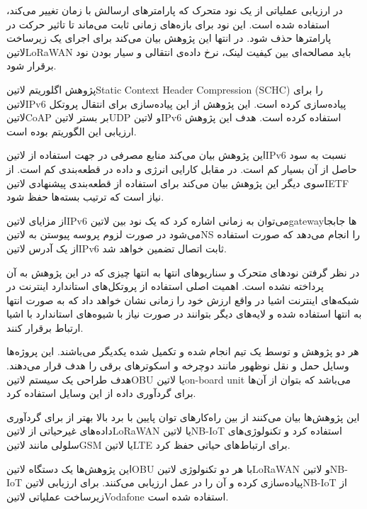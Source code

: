 در ارزیابی عملیاتی از یک نود متحرک که پارامترهای ارسالش با زمان تغییر می‌کند، استفاده شده است. این نود برای بازه‌های زمانی ثابت می‌ماند تا تاثیر حرکت در پارامترها حذف شود.
در انتها این پژوهش بیان می‌کند برای اجرای یک زیرساخت ‌لاتین{LoRaWAN} باید مصالحه‌ای بین کیفیت لینک، نرخ داده‌ی انتقالی و سیار بودن نود برقرار شود.


پژوهش 
اگلوریتم ‌لاتین{Static Context Header Compression (SCHC)} را برای ‌لاتین{IPv6} پیاده‌سازی کرده است.
این پژوهش از این پیاده‌سازی برای انتقال پروتکل ‌لاتین{CoAP} بر بستر ‌لاتین{UDP} و ‌لاتین{IPv6} استفاده کرده است.
هدف این پژوهش ارزیابی این الگوریتم بوده است.

این پژوهش بیان می‌کند منابع مصرفی در جهت استفاده از ‌لاتین{IPv6} نسبت به سود حاصل از آن بسیار کم است. در مقابل کارایی انرژی و داده در قطعه‌بندی کم است.
از سوی دیگر این پژوهش بیان می‌کند برای استفاده از قطعه‌بندی پیشنهادی ‌لاتین{IETF} نیاز است که ترتیب بسته‌ها حفظ شود.

از مزایای ‌لاتین{IPv6} می‌توان به زمانی اشاره کرد که یک نود بین ‌لاتین{gateway}ها جابجا می‌شود در صورت لزوم پروسه پیوستن به ‌لاتین{NS} را انجام می‌دهد که صورت استفاده از یک آدرس ‌لاتین{IPv6} ثابت اتصال تضمین خواهد شد.

در نظر گرفتن نودهای متحرک و سناریوهای انتها به انتها چیزی که در این پژوهش به آن پرداخته نشده است. اهمیت اصلی استفاده از پروتکل‌های استاندارد اینترنت در شبکه‌های اینترنت اشیا
در واقع ارزش خود را زمانی نشان خواهد داد که به صورت انتها به انتها استفاده شده و لایه‌های دیگر بتوانند در صورت نیاز با شیوه‌های استاندارد با اشیا ارتباط برقرار کنند.



هر دو پژوهش  و  توسط یک تیم انجام شده و تکمیل شده یکدیگر می‌باشند. این پروژه‌ها وسایل حمل و نقل نوظهور مانند دوچرخه و اسکوترهای برقی را هدف قرار می‌دهند.
هدف طراحی یک سیستم ‌لاتین{OBU} یا ‌لاتین{on-board unit} می‌باشد که بتوان از آن‌ها برای گردآوری داده از این وسایل استفاده کرد.

این پژوهش‌ها بیان می‌کنند از بین راه‌کارهای توان پایین با برد بالا بهتر از برای گردآوری داده‌های غیرحیاتی از ‌لاتین{LoRaWAN} یا ‌لاتین{NB-IoT} استفاده کرد
و تکنولوژی‌های سلولی مانند ‌لاتین{GSM} یا ‌لاتین{LTE} برای ارتباط‌های حیاتی حفظ کرد.

این پژوهش‌ها یک دستگاه ‌لاتین{OBU} با هر دو تکنولوژی ‌لاتین{LoRaWAN} و ‌لاتین{NB-IoT} پیاده‌سازی کرده و آن را در عمل ارزیابی می‌کنند.
برای ارزیابی ‌لاتین{NB-IoT} از زیرساخت عملیاتی ‌لاتین{Vodafone} استفاده شده است.

